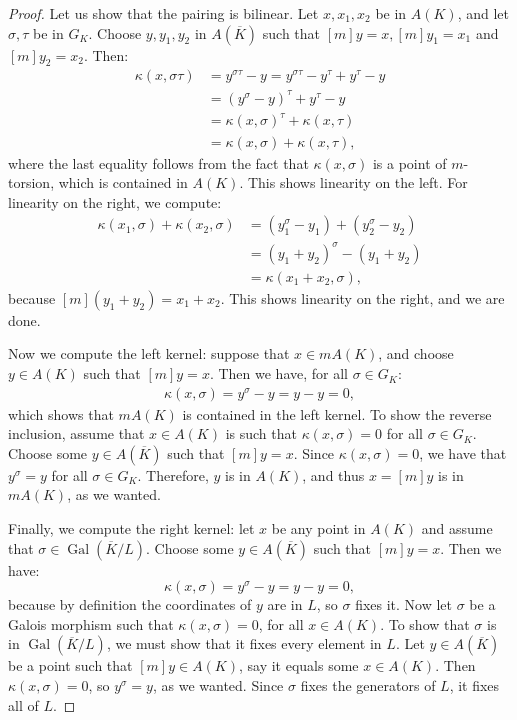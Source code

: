 \documentclass[a4paper, 12pt]{amsart}
\theoremstyle{definition}
\theoremstyle{plain}
\theoremstyle{plain}
\theoremstyle{plain}
\theoremstyle{plain}
\theoremstyle{remark}
\theoremstyle{remark}
\theoremstyle{plain}
\DeclareMathOperator{\Gal}{Gal}
\begin{document}
	\begin{proof}
		Let us show that the pairing is bilinear. Let $x,x_1,x_2$ be in $A(K)$, and let $\sigma,\tau$ be in $G_K$. Choose $y,y_1,y_2$ in $A(\overline{K})$ such that $[m]y=x,[m]y_1=x_1$ and $[m]y_2=x_2$. Then:
		\begin{align*}
			\kappa(x,\sigma\tau)&=y^{\sigma\tau}-y=y^{\sigma\tau}-y^\tau+y^\tau-y\\
			&=(y^\sigma-y)^\tau + y^\tau-y\\
			&=\kappa(x,\sigma)^\tau + \kappa(x,\tau)\\
			&=\kappa(x,\sigma) + \kappa(x,\tau),
		\end{align*}
		where the last equality follows from the fact that $\kappa(x,\sigma)$ is a point of $m$-torsion, which is contained in $A(K)$. This shows linearity on the left. For linearity on the right, we compute:
		\begin{align*}
			\kappa(x_1,\sigma)+\kappa(x_2,\sigma)&=(y_1^\sigma-y_1)+(y_2^\sigma-y_2)\\
			&=(y_1+y_2)^\sigma - (y_1+y_2)\\
			&=\kappa(x_1+x_2,\sigma),
		\end{align*}
		because $[m](y_1+y_2)=x_1+x_2$. This shows linearity on the right, and we are done.
		
		Now we compute the left kernel: suppose that $x\in mA(K)$, and choose $y\in A(K)$ such that $[m]y=x$. Then we have, for all $\sigma\in G_K$:
		\begin{align*}
			\kappa(x,\sigma)=y^\sigma-y=y-y=0,
		\end{align*}
		which shows that $mA(K)$ is contained in the left kernel. To show the reverse inclusion, assume that $x\in A(K)$ is such that $\kappa(x,\sigma)=0$ for all $\sigma\in G_K$. Choose some $y\in A(\overline{K})$ such that $[m]y=x$. Since $\kappa(x,\sigma)=0$, we have that $y^\sigma=y$ for all $\sigma\in G_K$. Therefore, $y$ is in $A(K)$, and thus $x=[m]y$ is in $mA(K)$, as we wanted.
		
		Finally, we compute the right kernel: let $x$ be any point in $A(K)$ and assume that $\sigma\in\Gal(\overline{K}/L)$. Choose some $y\in A(\overline{K})$ such that $[m]y=x$. Then we have:
		\begin{equation*}
			\kappa(x,\sigma)=y^\sigma-y=y-y=0,
		\end{equation*}
		because by definition the coordinates of $y$ are in $L$, so $\sigma$ fixes it. Now let $\sigma$ be a Galois morphism such that $\kappa(x,\sigma)=0$, for all $x\in A(K)$. To show that $\sigma$ is in $\Gal(\overline{K}/L)$, we must show that it fixes every element in $L$. Let $y\in A(\overline{K})$ be a point such that $[m]y\in A(K)$, say it equals some $x\in A(K)$. Then $\kappa(x,\sigma)=0$, so $y^\sigma=y$, as we wanted. Since $\sigma$ fixes the generators of $L$, it fixes all of $L$.
	\end{proof}
\end{document}
